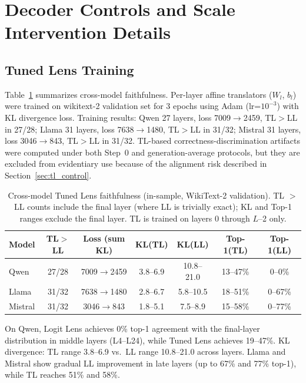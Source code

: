 \documentclass{ieeeaccess}
\begin{document}
\FloatBarrier
\section{Decoder Controls and Scale Intervention Details}
\label{app:tuned}
\label{app:decoder_controls}

\subsection{Tuned Lens Training}

Table~\ref{tab:faithfulness_cross} summarizes cross-model faithfulness. Per-layer affine translators ($W_l$, $b_l$) were trained on wikitext-2 validation set for 3 epochs using Adam (lr=$10^{-3}$) with KL divergence loss. Training results: Qwen 27 layers, loss 7009$\to$2459, TL$>$LL in 27/28; Llama 31 layers, loss 7638$\to$1480, TL$>$LL in 31/32; Mistral 31 layers, loss 3046$\to$843, TL$>$LL in 31/32. TL-based correctness-discrimination artifacts were computed under both Step~0 and generation-average protocols, but they are excluded from evidentiary use because of the alignment risk described in Section~\ref{sec:tl_control}.

\begin{table}[!ht]
\centering
\caption{Cross-model Tuned Lens faithfulness (in-sample, WikiText-2 \cite{merity2016wikitext} validation). TL $>$ LL counts include the final layer (where LL is trivially exact); KL and Top-1 ranges exclude the final layer. TL is trained on layers 0 through $L$--2 only.}
\label{tab:faithfulness_cross}
\footnotesize
\setlength{\tabcolsep}{1pt}
\begin{tabular}{l c c cc cc}
\toprule
Model & TL$>$LL & Loss (sum KL) & KL(TL) & KL(LL) & Top-1(TL) & Top-1(LL) \\
\midrule
Qwen & 27/28 & 7009$\to$2459 & 3.8--6.9 & 10.8--21.0 & 13--47\% & 0--0\% \\
Llama & 31/32 & 7638$\to$1480 & 2.8--6.7 & 5.8--10.5 & 18--51\% & 0--67\% \\
Mistral & 31/32 & 3046$\to$843 & 1.8--5.1 & 7.5--8.9 & 15--58\% & 0--77\% \\
\bottomrule
\end{tabular}
\end{table}

On Qwen, Logit Lens achieves 0\% top-1 agreement with the final-layer distribution in middle layers (L4--L24), while Tuned Lens achieves 19--47\%. KL divergence: TL range 3.8--6.9 vs.\ LL range 10.8--21.0 across layers. Llama and Mistral show gradual LL improvement in late layers (up to 67\% and 77\% top-1), while TL reaches 51\% and 58\%.
\end{document}
